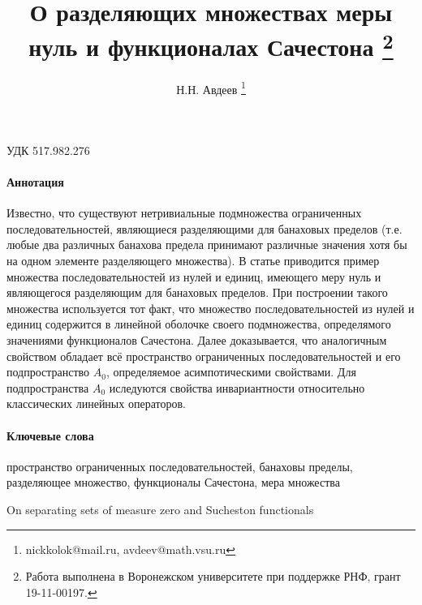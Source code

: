 \documentclass[a4paper,14pt]{article} %
\theoremstyle{plain}
\begin{document}

\title{
	О разделяющих множествах меры нуль и функционалах Сачестона
	\footnote{
		Работа выполнена в Воронежском университете при поддержке РНФ, грант 19-11-00197.
	}
}

\author{
	Н.Н. Авдеев
	\footnote{nickkolok@mail.ru, avdeev@math.vsu.ru}
}

\maketitle

УДК 517.982.276 %

\paragraph{Аннотация}
Известно, что существуют нетривиальные подмножества ограниченных последовательностей,
являющиеся разделяющими для банаховых пределов
(т.е. любые два различных банахова предела принимают различные значения
хотя бы на одном элементе разделяющего множества).
В статье приводится пример множества последовательностей из нулей и единиц,
имеющего меру нуль и являющегося разделяющим для банаховых пределов.
При построении такого множества используется тот факт, что множество последовательностей
из нулей и единиц содержится в линейной оболочке своего подмножества,
определямого значениями функционалов Сачестона.
Далее доказывается, что аналогичным свойством обладает всё пространство ограниченных последовательностей
и его подпространство $A_0$, определяемое асимпотическими свойствами.
Для подпространства $A_0$ иследуются свойства инвариантности относительно классических линейных операторов.

\paragraph{Ключевые слова}
	пространство ограниченных последовательностей,
	банаховы пределы,
	разделяющее множество,
	функционалы Сачестона,
	мера множества


On separating sets of measure zero and Sucheston functionals
\end{document}

